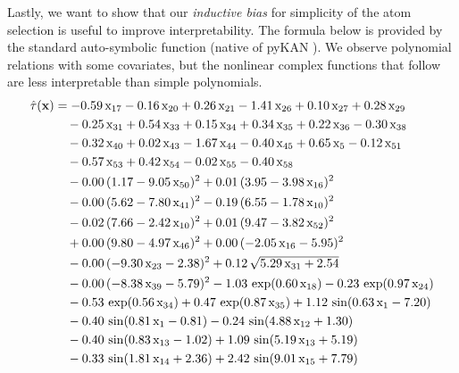 Lastly, we want to show that our \emph{inductive bias} for simplicity of the atom selection is useful to improve interpretability. The formula below is provided by the standard auto-symbolic function (native of pyKAN \citep{liu2024kan}). We observe polynomial relations with some covariates, but the nonlinear complex functions that follow are less interpretable than simple polynomials.
{\small
\begin{align*}
\hcate{\covariates}
&= -0.59\,\covariate_{17}
- 0.16\,\covariate_{20}
+ 0.26\,\covariate_{21}
- 1.41\,\covariate_{26}
+ 0.10\,\covariate_{27}
+ 0.28\,\covariate_{29} \\
&\quad - 0.25\,\covariate_{31}
+ 0.54\,\covariate_{33}
+ 0.15\,\covariate_{34}
+ 0.34\,\covariate_{35}
+ 0.22\,\covariate_{36}
- 0.30\,\covariate_{38} \\
&\quad - 0.32\,\covariate_{40}
+ 0.02\,\covariate_{43}
- 1.67\,\covariate_{44}
- 0.40\,\covariate_{45}
+ 0.65\,\covariate_{5}
- 0.12\,\covariate_{51} \\
&\quad - 0.57\,\covariate_{53}
+ 0.42\,\covariate_{54}
- 0.02\,\covariate_{55}
- 0.40\,\covariate_{58} \\
&\quad - 0.00\,(1.17 - 9.05\,\covariate_{50})^{2}
+ 0.01\,(3.95 - 3.98\,\covariate_{16})^{2} \\
&\quad - 0.00\,(5.62 - 7.80\,\covariate_{41})^{2}
- 0.19\,(6.55 - 1.78\,\covariate_{10})^{2} \\
&\quad - 0.02\,(7.66 - 2.42\,\covariate_{10})^{2}
+ 0.01\,(9.47 - 3.82\,\covariate_{52})^{2} \\
&\quad + 0.00\,(9.80 - 4.97\,\covariate_{46})^{2}
+ 0.00\,(-2.05\,\covariate_{16} - 5.95)^{2} \\
&\quad - 0.00\,(-9.30\,\covariate_{23} - 2.38)^{2}
+ 0.12\,\sqrt{5.29\,\covariate_{31} + 2.54} \\
&\quad - 0.00\,(-8.38\,\covariate_{39} - 5.79)^{2}
- 1.03\,\exp(0.60\,\covariate_{18})
- 0.23\,\exp(0.97\,\covariate_{24}) \\
&\quad - 0.53\,\exp(0.56\,\covariate_{34})
+ 0.47\,\exp(0.87\,\covariate_{35})
+ 1.12\,\sin(0.63\,\covariate_{1} - 7.20) \\
&\quad - 0.40\,\sin(0.81\,\covariate_{1} - 0.81)
- 0.24\,\sin(4.88\,\covariate_{12} + 1.30) \\
&\quad - 0.40\,\sin(0.83\,\covariate_{13} - 1.02)
+ 1.09\,\sin(5.19\,\covariate_{13} + 5.19) \\
&\quad - 0.33\,\sin(1.81\,\covariate_{14} + 2.36)
+ 2.42\,\sin(9.01\,\covariate_{15} + 7.79) \\

\end{align*}}
